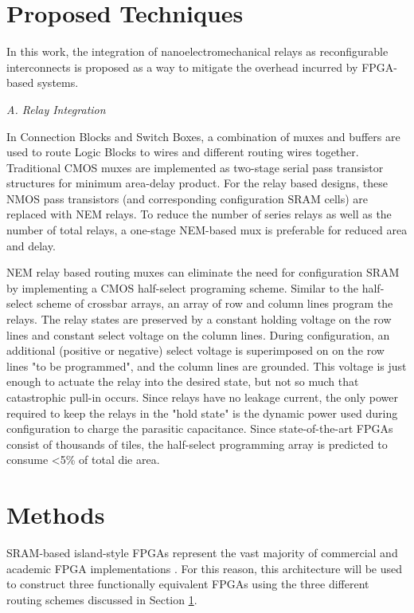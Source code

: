 \documentclass[twoside,twocolumn]{article}
\begin{document}

\section{Proposed Techniques}\label{sec:proposed}

In this work, the integration of nanoelectromechanical relays as reconfigurable interconnects is proposed as a way to mitigate the overhead incurred by FPGA-based systems. 

\textit{A. Relay Integration}

In Connection Blocks and Switch Boxes, a combination of muxes and buffers are used to route Logic Blocks to wires and different routing wires together. Traditional CMOS muxes are implemented as two-stage serial pass transistor structures for minimum area-delay product. For the relay based designs, these NMOS pass transistors (and corresponding configuration SRAM cells) are replaced with NEM relays. To reduce the number of series relays as well as the number of total relays, a one-stage NEM-based mux is preferable for reduced area and delay\cite{chen_efficient_2010}.

NEM relay based routing muxes can eliminate the need for configuration SRAM by implementing a CMOS half-select programing scheme\cite{chen_efficient_2010}. Similar to the half-select scheme of crossbar arrays, an array of row and column lines program the relays. The relay states are preserved by a constant holding voltage on the row lines and constant select voltage on the column lines. During configuration, an additional (positive or negative) select voltage is superimposed on on the row lines "to be programmed", and the column lines are grounded. This voltage is just enough to actuate the relay into the desired state, but not so much that catastrophic pull-in occurs. Since relays have no leakage current, the only power required to keep the relays in the "hold state" is the dynamic power used during configuration to charge the parasitic capacitance. Since state-of-the-art FPGAs consist of thousands of tiles, the half-select programming array is predicted to consume <5\% of total die area.


\section{Methods}
SRAM-based island-style FPGAs represent the vast majority of commercial and academic
FPGA implementations \cite{farooq_fpga_2012}. For this reason, this architecture 
will be used to construct three functionally equivalent FPGAs using the three different
routing schemes discussed in Section \ref{sec:proposed}. 
\end{document}
